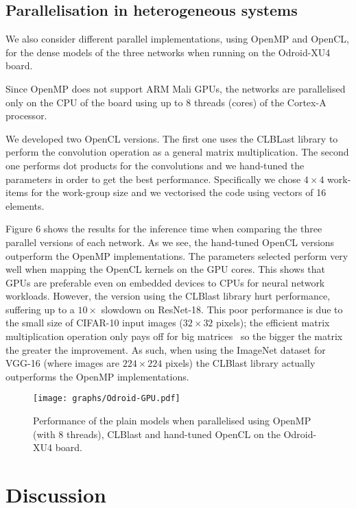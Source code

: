 \documentclass[conference]{IEEEtran}
\begin{document}
\subsection{Parallelisation in heterogeneous systems}We also consider different parallel implementations, using OpenMP and OpenCL, for the dense models of the three networks when running on the Odroid-XU4 board. 

Since OpenMP does not support ARM Mali GPUs, the networks are parallelised only on the CPU of the board using up to 8 threads (cores) of the Cortex-A processor. 

We developed two OpenCL versions. The first one uses the CLBLast library to perform the convolution operation as a general matrix multiplication. The second one performs dot products for the convolutions and we hand-tuned the parameters in order to get the best performance. Specifically we chose $4 \times 4$ work-items for the work-group size and we vectorised the code using vectors of 16 elements.

Figure 6 shows the results for the inference time when comparing the three parallel versions of each network. As we see, the hand-tuned OpenCL versions outperform the OpenMP implementations. The parameters selected perform very well when mapping the OpenCL kernels on the GPU cores. This shows that GPUs are preferable even on embedded devices to CPUs for neural network workloads. However, the version using the CLBlast library hurt performance, suffering up to a $10\times$ slowdown on ResNet-18. This poor performance is due to the small size of CIFAR-10 input images ($32\times32$ pixels); the efficient matrix multiplication operation only pays off for big matrices~\cite{multiprog_2018} so the bigger the matrix the greater the improvement. As such, when using the ImageNet dataset for VGG-16 (where images are $224\times224$ pixels) the CLBlast library actually outperforms the OpenMP implementations.

\begin{figure}
\centering
\texttt{[image: graphs/Odroid-GPU.pdf]}
\label{fig:parallel}
\caption{Performance of the plain models when parallelised using OpenMP (with 8 threads), CLBlast and hand-tuned OpenCL on the Odroid-XU4 board.}
\end{figure}


\section{Discussion}\label{sec:discussion}
\end{document}
